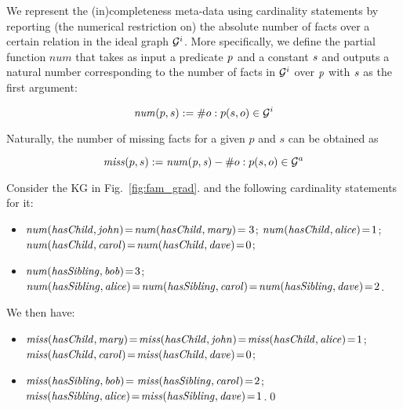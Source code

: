 We represent the (in)completeness meta-data using cardinality statements by reporting (the numerical restriction on) the absolute number of facts over a certain relation in the ideal graph $\mathcal{G}^i$. More specifically, we define the partial function $num$ that takes as input a predicate $\mathit{p}$ and a constant $\mathit{s}$ and outputs a natural number corresponding to the number of facts in $\mathcal{G}^i$ over $\mathit{p}$ with $\mathit{s}$ as the first argument: 

\begin{equation}\label{eq:num}
\mathit{num}(p,s) := \# o : p(s,o) \in \mathcal{G}^i 
\end{equation}

Naturally, the number of missing facts for a given $p$ and $s$ can be obtained as

\begin{equation}\label{eq:miss}
\mi{miss}(p,s) := \mi{num(p,s)} - \#o : p(s,o) \in \cG^a %
\end{equation}

\begin{example}
\label{ex:cardinality}
Consider the KG in Fig.~\ref{fig:fam_grad}.
and the following cardinality statements for it: %
\vspace{-\topsep}
\begin{itemize}
\setlength{\parskip}{0pt}
\setlength{\itemsep}{0pt plus 1pt}
\item $\mathit{num(hasChild,john)}\!=\!\mathit{num(hasChild,mary)}\!=3$; $\mathit{num(hasChild,alice)}\!=\!1$;\\  $\mathit{num(hasChild,carol)}\!=\!\mathit{num(hasChild,dave)}\!=\!0$;
\item $\mathit{num(hasSibling,bob)}\!=\!3$;
      $\mathit{num(hasSibling,alice)}\!=\!\mathit{num(hasSibling,carol)}\!=\!\mathit{num(hasSibling,dave)}\!=\!2$.
\end{itemize}
\vspace{-\topsep}
We then have:
\vspace{-\topsep}
\begin{itemize}
\setlength{\parskip}{0pt}
\setlength{\itemsep}{0pt plus 1pt}
\item $\mathit{miss(hasChild,mary)}\!=\!\mathit{miss(hasChild,john)}\!=\!\mathit{miss(hasChild,alice)}\!=\!1$;\\
      $\mathit{miss(hasChild,carol)}\!=\!\mathit{miss(hasChild,dave)}\!=\!0$; 
\item $\mathit{miss(hasSibling,bob)}\!=\mathit{miss(hasSibling,carol)}\!=\!2$;\\ 
      $\mathit{miss(hasSibling,alice)}\!=\!\mathit{miss(hasSibling,dave)}\!=\!1$.\qed
\end{itemize}
\end{example}


